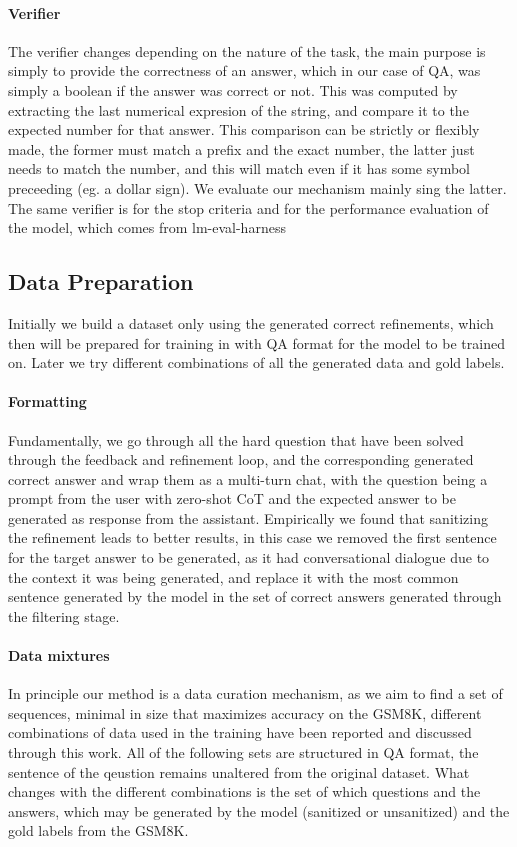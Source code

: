 \documentclass[a4paper,10pt]{article}
\begin{document}
\paragraph{Verifier}
The verifier changes depending on the nature of the task, the main purpose is simply to provide the correctness of an answer, which in our case of QA, was simply a boolean if the answer was correct or not. This was computed by extracting the last numerical expresion of the string, and compare it to the expected number for that answer. This comparison can be strictly or flexibly made, the former must match a prefix and the exact number, the latter just needs to match the number, and this will match even if it has some symbol preceeding (eg. a dollar sign). We evaluate our mechanism mainly sing the latter. The same verifier is for the stop criteria and for the performance evaluation of the model, which comes from lm-eval-harness


\subsection{Data Preparation}
Initially we build a dataset only using the generated correct refinements, which then will be prepared for training in with QA format for the model to be trained on. Later we try different combinations of all the generated data and gold labels.
\paragraph{Formatting}
Fundamentally, we go through all the hard question that have been solved through the feedback and refinement loop, and the corresponding generated correct answer and wrap them as a multi-turn chat, with the question being a prompt from the user with zero-shot CoT and the expected answer to be generated as response from the assistant. Empirically we found that sanitizing the refinement leads to better results, in this case we removed the first sentence for the target answer to be generated, as it had conversational dialogue due to the context it was being generated, and replace it with the most common sentence generated by the model in the set of correct answers generated through the filtering stage. 
\paragraph{Data mixtures}
In principle our method is a data curation mechanism, as we aim to find a set of sequences, minimal in size that maximizes accuracy on the GSM8K, different combinations of data used in the training have been reported and discussed through this work. All of the following sets are structured in QA format, the sentence of the qeustion remains unaltered from the original dataset. What changes with the different combinations is the set of which questions and the answers, which may be generated by the model (sanitized or unsanitized) and the gold labels from the GSM8K. 
\end{document}
